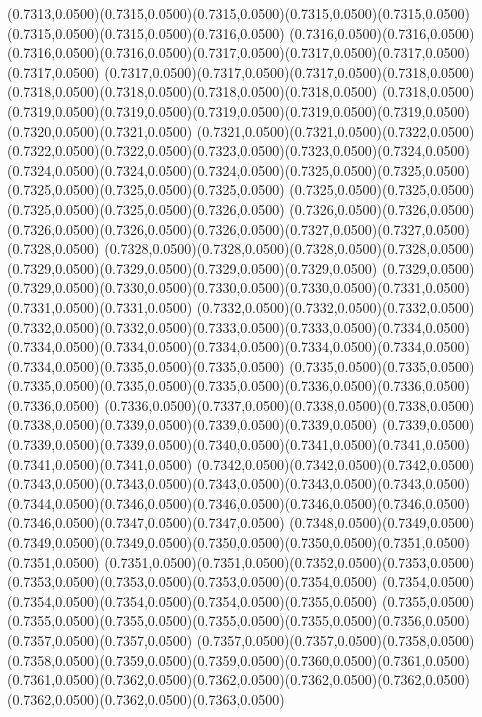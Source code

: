 (0.7313,0.0500)(0.7315,0.0500)(0.7315,0.0500)(0.7315,0.0500)(0.7315,0.0500)(0.7315,0.0500)(0.7315,0.0500)(0.7316,0.0500)
(0.7316,0.0500)(0.7316,0.0500)(0.7316,0.0500)(0.7316,0.0500)(0.7317,0.0500)(0.7317,0.0500)(0.7317,0.0500)(0.7317,0.0500)
(0.7317,0.0500)(0.7317,0.0500)(0.7317,0.0500)(0.7318,0.0500)(0.7318,0.0500)(0.7318,0.0500)(0.7318,0.0500)(0.7318,0.0500)
(0.7318,0.0500)(0.7319,0.0500)(0.7319,0.0500)(0.7319,0.0500)(0.7319,0.0500)(0.7319,0.0500)(0.7320,0.0500)(0.7321,0.0500)
(0.7321,0.0500)(0.7321,0.0500)(0.7322,0.0500)(0.7322,0.0500)(0.7322,0.0500)(0.7323,0.0500)(0.7323,0.0500)(0.7324,0.0500)
(0.7324,0.0500)(0.7324,0.0500)(0.7324,0.0500)(0.7325,0.0500)(0.7325,0.0500)(0.7325,0.0500)(0.7325,0.0500)(0.7325,0.0500)
(0.7325,0.0500)(0.7325,0.0500)(0.7325,0.0500)(0.7325,0.0500)(0.7326,0.0500)
\PST@Solid(0.7326,0.0500)(0.7326,0.0500)(0.7326,0.0500)(0.7326,0.0500)(0.7326,0.0500)(0.7327,0.0500)(0.7327,0.0500)(0.7328,0.0500)
(0.7328,0.0500)(0.7328,0.0500)(0.7328,0.0500)(0.7328,0.0500)(0.7329,0.0500)(0.7329,0.0500)(0.7329,0.0500)(0.7329,0.0500)
(0.7329,0.0500)(0.7329,0.0500)(0.7330,0.0500)(0.7330,0.0500)(0.7330,0.0500)(0.7331,0.0500)(0.7331,0.0500)(0.7331,0.0500)
(0.7332,0.0500)(0.7332,0.0500)(0.7332,0.0500)(0.7332,0.0500)(0.7332,0.0500)(0.7333,0.0500)(0.7333,0.0500)(0.7334,0.0500)
(0.7334,0.0500)(0.7334,0.0500)(0.7334,0.0500)(0.7334,0.0500)(0.7334,0.0500)(0.7334,0.0500)(0.7335,0.0500)(0.7335,0.0500)
(0.7335,0.0500)(0.7335,0.0500)(0.7335,0.0500)(0.7335,0.0500)(0.7335,0.0500)(0.7336,0.0500)(0.7336,0.0500)(0.7336,0.0500)
(0.7336,0.0500)(0.7337,0.0500)(0.7338,0.0500)(0.7338,0.0500)(0.7338,0.0500)(0.7339,0.0500)(0.7339,0.0500)(0.7339,0.0500)
(0.7339,0.0500)(0.7339,0.0500)(0.7339,0.0500)(0.7340,0.0500)(0.7341,0.0500)(0.7341,0.0500)(0.7341,0.0500)(0.7341,0.0500)
(0.7342,0.0500)(0.7342,0.0500)(0.7342,0.0500)(0.7343,0.0500)(0.7343,0.0500)(0.7343,0.0500)(0.7343,0.0500)(0.7343,0.0500)
(0.7344,0.0500)(0.7346,0.0500)(0.7346,0.0500)(0.7346,0.0500)(0.7346,0.0500)(0.7346,0.0500)(0.7347,0.0500)(0.7347,0.0500)
(0.7348,0.0500)(0.7349,0.0500)(0.7349,0.0500)(0.7349,0.0500)(0.7350,0.0500)(0.7350,0.0500)(0.7351,0.0500)(0.7351,0.0500)
(0.7351,0.0500)(0.7351,0.0500)(0.7352,0.0500)(0.7353,0.0500)(0.7353,0.0500)(0.7353,0.0500)(0.7353,0.0500)(0.7354,0.0500)
(0.7354,0.0500)(0.7354,0.0500)(0.7354,0.0500)(0.7354,0.0500)(0.7355,0.0500)
\PST@Solid(0.7355,0.0500)(0.7355,0.0500)(0.7355,0.0500)(0.7355,0.0500)(0.7355,0.0500)(0.7356,0.0500)(0.7357,0.0500)(0.7357,0.0500)
(0.7357,0.0500)(0.7357,0.0500)(0.7358,0.0500)(0.7358,0.0500)(0.7359,0.0500)(0.7359,0.0500)(0.7360,0.0500)(0.7361,0.0500)
(0.7361,0.0500)(0.7362,0.0500)(0.7362,0.0500)(0.7362,0.0500)(0.7362,0.0500)(0.7362,0.0500)(0.7362,0.0500)(0.7363,0.0500)
